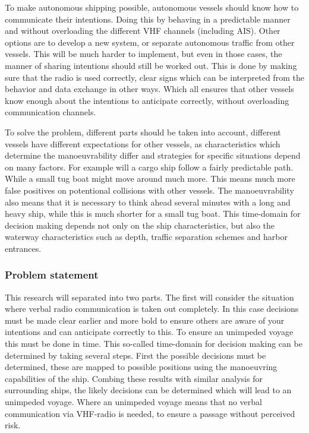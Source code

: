 To make autonomous shipping possible, autonomous vessels should know how to communicate their intentions. Doing this by behaving in a predictable manner and without overloading the different VHF channels (including AIS). Other options are to develop a new system, or separate autonomous traffic from other vessels. This will be much harder to implement, but even in those cases, the manner of sharing intentions should still be worked out. This is done by making sure that the radio is used correctly, clear signs which can be interpreted from the behavior and data exchange in other ways. Which all ensures that other vessels know enough about the intentions to anticipate correctly, without overloading communication channels.

To solve the problem, different parts should be taken into account, different vessels have different expectations for other vessels, as characteristics which determine the manoeuvrability differ and strategies for specific situations depend on many factors. For example will a cargo ship follow a fairly predictable path. While a small tug boat might move around much more. This means much more false positives on potentional collisions with other vessels. The manoeuvrability also means that it is necessary to think ahead several minutes with a long and heavy ship, while this is much shorter for a small tug boat. This time-domain for decision making depends not only on the ship characteristics, but also the waterway characteristics such as depth, traffic separation schemes and harbor entrances.

\subsubsection*{Problem statement}
This research will separated into two parts. The first will consider the situation where verbal radio communication is taken out completely. In this case decisions must be made clear earlier and more bold to ensure others are aware of your intentions and can anticipate correctly to this. To ensure an unimpeded voyage this must be done in time. This so-called time-domain for decision making can be determined by taking several steps. First the possible decisions must be determined, these are mapped to possible positions using the manoeuvring capabilities of the ship. Combing these results with similar analysis for surrounding ships, the likely decisions can be determined which will lead to an unimpeded voyage. Where an unimpeded voyage means that no verbal communication via VHF-radio is needed, to ensure a passage without perceived risk.

